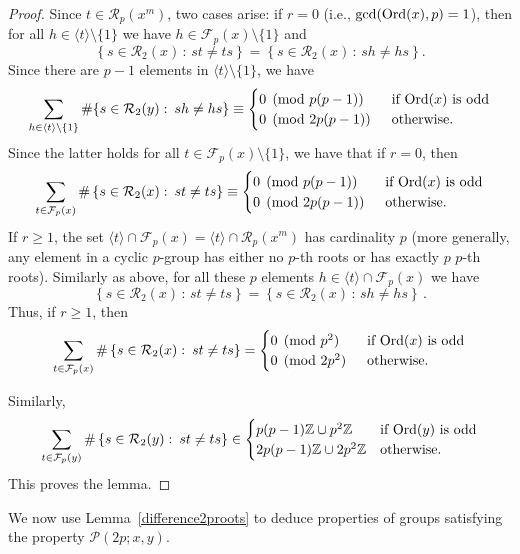 \documentclass[12pt]{amsart}
\numberwithin{equation}{section}
\newcommand{\Ord}{{\rm Ord}}
\newcommand{\Z}{\mathbb Z}
\theoremstyle{definition}
\theoremstyle{remark}
\begin{document}
\begin{proof}
    Since $t\in \mathcal{R}_p(x^m)$, two cases arise: if $r=0$ (i.e., $\gcd(\Ord(x),p)=1$), then for all $h\in\langle t\rangle\setminus \{1\} $ we have $h\in \mathcal{F}_p(x)\setminus\{1\}$ and \[\left\{s\in \mathcal{R}_2(x)\, \colon\,  st\ne ts\right\}=\left\{s\in \mathcal{R}_2(x)\, \colon\,  sh\ne hs\right\}.\]
    Since there are $p-1$ elements in $\langle t\rangle\setminus\{1\}$, we have \[\sum_{h\in \langle t\rangle\setminus\{1\}} \#\{s\in \mathcal{R}_2(y)\, \colon\,  sh\ne hs\}\equiv\begin{cases}
        0\pmod{ p(p-1)}\quad&\text{if } \Ord(x)\text{ is odd}\\
        0\pmod{ 2p(p-1)} &\text{otherwise}.
    \end{cases}\]
    Since the latter holds for all $t\in \mathcal{F}_p(x)\setminus\{1\}$, we have that if $r=0$, then \[\sum_{t\in \mathcal{F}_p(x)}\#\left\{s\in \mathcal{R}_2(x)\, \colon\,  st\ne ts\right\}\equiv\begin{cases}
        0\pmod{ p(p-1)}\quad&\text{if } \Ord(x)\text{ is odd}\\
        0\pmod{ 2p(p-1)} &\text{otherwise}.
    \end{cases} \] 
    If $r\ge 1$, the set $\langle t\rangle\cap\mathcal{F}_p(x)=\langle t\rangle\cap\mathcal{R}_p(x^m)$ has cardinality $p$ (more generally, any element in a cyclic $p$-group has either no $p$-th roots or has exactly $p$ $p$-th roots). Similarly as above, for all these $p$ elements $h\in \langle t\rangle\cap\mathcal{F}_p(x) $ we have
    \[\left\{s\in \mathcal{R}_2(x)\, \colon\,  st\ne ts\right\}=\left\{s\in \mathcal{R}_2(x)\, \colon\,  sh\ne hs\right\}\, .\]
    Thus, if $r\ge1$, then
    \[\sum_{t\in \mathcal{F}_p(x)}\#\left\{s\in \mathcal{R}_2(x)\, \colon\,  st\ne ts\right\}=\begin{cases}
        0\pmod{ p^2}\quad&\text{if } \Ord(x)\text{ is odd}\\
        0\pmod{ 2p^2} &\text{otherwise}.
    \end{cases} \]  
    
    Similarly,  \[\sum_{t\in \mathcal{F}_p(y)}\#\left\{s\in \mathcal{R}_2(y)\, \colon\,  st\ne ts\right\}\in\begin{cases}
        p(p-1)\Z\cup p^2\Z\quad&\text{if } \Ord(y)\text{ is odd}\\
        2p(p-1)\Z\cup 2p^2\Z &\text{otherwise}.
    \end{cases} \]  
    This proves the lemma.
\end{proof}
We now use Lemma~\ref{difference2proots} to deduce properties of groups satisfying the property $\mathcal{P}(2p;x,y)$.
\end{document}
